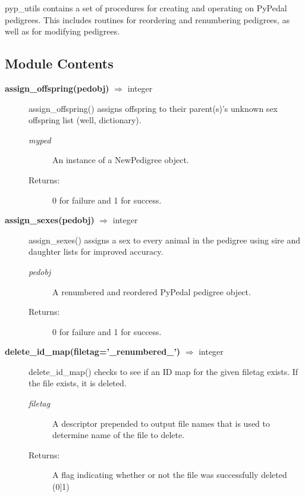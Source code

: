 pyp\_utils contains a set of procedures for creating and operating on PyPedal pedigrees. This includes routines for reordering and renumbering pedigrees, as well as for modifying pedigrees.

\subsection*{Module Contents}

\begin{description}
\item[\textbf{assign\_offspring(pedobj)} $\Rightarrow$ integer]
assign\_offspring() assigns offspring to their parent(s)'s unknown sex offspring list (well, dictionary).
\begin{description}
\item[\emph{myped}] An instance of a NewPedigree object.
\item[Returns:] 0 for failure and 1 for success.
\end{description}

\item[\textbf{assign\_sexes(pedobj)} $\Rightarrow$ integer]
assign\_sexes() assigns a sex to every animal in the pedigree using sire and daughter lists for improved accuracy.
\begin{description}
\item[\emph{pedobj}] A renumbered and reordered PyPedal pedigree object.
\item[Returns:] 0 for failure and 1 for success.
\end{description}

\item[\textbf{delete\_id\_map(filetag='\_renumbered\_')} $\Rightarrow$ integer]
delete\_id\_map() checks to see if an ID map for the given filetag exists. If the file exists, it is deleted.
\begin{description}
\item[\emph{filetag}] A descriptor prepended to output file names that is used to determine name of the file to delete.
\item[Returns:] A flag indicating whether or not the file was successfully deleted (0|1)
\end{description}


\end{description}
